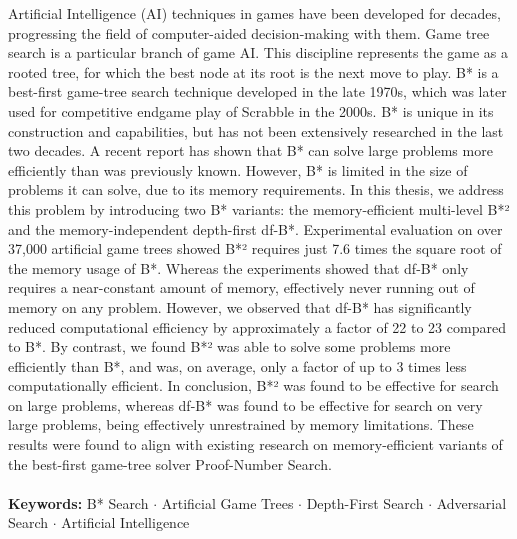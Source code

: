 Artificial Intelligence (AI) techniques in games have been developed for decades, progressing the field of computer-aided decision-making with them. Game tree search is a particular branch of game AI. This discipline represents the game as a rooted tree, for which the best node at its root is the next move to play. B* is a best-first game-tree search technique developed in the late 1970s, which was later used for competitive endgame play of Scrabble in the 2000s. B* is unique in its construction and capabilities, but has not been extensively researched in the last two decades. A recent report has shown that B* can solve large problems more efficiently than was previously known. However, B* is limited in the size of problems it can solve, due to its memory requirements. In this thesis, we address this problem by introducing two B* variants: the memory-efficient multi-level B*² and the memory-independent depth-first df-B*. 
Experimental evaluation on over 37,000 artificial game trees showed B*² requires just 7.6 times the square root of the memory usage of B*. Whereas the experiments showed that df-B* only requires a near-constant amount of memory, effectively never running out of memory on any problem. However, we observed that df-B* has significantly reduced computational efficiency by approximately a factor of 22 to 23 compared to B*. By contrast, we found B*² was able to solve some problems more efficiently than B*, and was, on average, only a factor of up to 3 times less computationally efficient. In conclusion, B*² was found to be effective for search on large problems, whereas df-B* was found to be effective for search on very large problems, being effectively unrestrained by memory limitations. These results were found to align with existing research on memory-efficient variants of the best-first game-tree solver Proof-Number Search.
\\
\phantom{}
\vspace{2ex}\\
\textbf{Keywords:} B* Search $\cdot$ Artificial Game Trees $\cdot$  Depth-First Search $\cdot$ Adversarial Search $\cdot$ Artificial Intelligence
